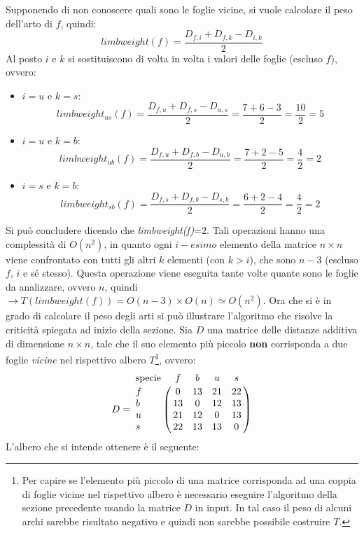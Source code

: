 Supponendo di non conoscere quali sono le foglie vicine, si vuole calcolare il peso dell'arto di $f$, quindi:
\[limbweight(f)=\frac{D_{f,i}+D_{f,k}-D_{i,k}}{2}\]
Al posto $i$ e $k$ si sostituiscono di volta in volta i valori delle foglie (escluso $f$), ovvero:
\begin{itemize}
	\item $i=u$ e $k=s$:
	\[limbweight_{us}(f)=\frac{D_{f,u}+D_{f,s}-D_{u,s}}{2}=\frac{7+6-3}{2}=\frac{10}{2}=5\]
	\item $i=u$ e $k=b$:
	\[limbweight_{ub}(f)=\frac{D_{f,u}+D_{f,b}-D_{u,b}}{2}=\frac{7+2-5}{2}=\frac{4}{2}=2\]
	\item $i=s$ e $k=b$:
	\[limbweight_{sb}(f)=\frac{D_{f,s}+D_{f,b}-D_{s,b}}{2}=\frac{6+2-4}{2}=\frac{4}{2}=2\]
\end{itemize}
Si può concludere dicendo che \textit{limbweight(f)}=$2$.
\newline
Tali operazioni hanno una complessità di $O(n^2)$, in quanto ogni $i-esimo$  elemento della matrice $n \times n$ viene confrontato con tutti gli altri $k$ elementi (con $k>i$), che sono $n-3$ (escluso $f$, $i$  e sé stesso). Questa operazione viene eseguita tante volte quante sono le foglie da analizzare, ovvero $n$, quindi $\rightarrow T(limbweight(f))=O(n-3)\times O(n)\simeq O(n^2)$.
\newline
Ora che si è in grado di calcolare il peso degli arti si può illustrare l'algoritmo che risolve la criticità spiegata ad inizio della sezione.
\newline
Sia $D$ una matrice delle distanze additiva di dimensione $n\times n$, tale che il suo elemento più piccolo \textbf{non} corrisponda a due foglie \textit{vicine} nel rispettivo albero $T$\footnote{Per capire se l'elemento più piccolo di una matrice corrisponda ad una coppia di foglie vicine nel rispettivo albero è necessario eseguire l'algoritmo della sezione precedente usando la matrice $D$ in input. In tal caso il peso di alcuni archi sarebbe risultato negativo e quindi non sarebbe possibile costruire $T$. }, ovvero:
\[
D = \bordermatrix{\text{specie}&f&b&u&s\cr
                f& 0 & 13 & 21 & 22\cr
                b& 13 & 0 & 12 & 13\cr
                u& 21 & 12 & 0 & 13\cr
                s& 22 & 13 & 13 & 0}
\]
\newpage
L'albero che si intende ottenere è il seguente:
